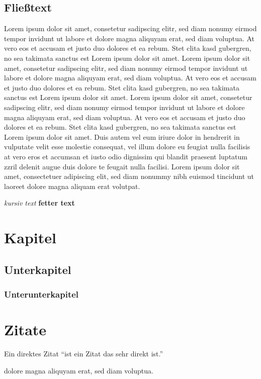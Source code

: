 \documentclass[a4paper, 12pt]{article}
\begin{document}
\subsection{Fließtext}
Lorem ipsum dolor sit amet, consetetur sadipscing elitr, sed diam nonumy eirmod tempor invidunt ut labore et dolore magna aliquyam erat, sed diam voluptua. At vero eos et accusam et justo duo dolores et ea rebum. Stet clita kasd gubergren, no sea takimata sanctus est Lorem ipsum dolor sit amet. Lorem ipsum dolor sit amet, consetetur sadipscing elitr, sed diam nonumy eirmod tempor invidunt ut labore et dolore magna aliquyam erat, sed diam voluptua. At vero eos et accusam et justo duo dolores et ea rebum. Stet clita kasd gubergren, no sea takimata sanctus est Lorem ipsum dolor sit amet. Lorem ipsum dolor sit amet, consetetur sadipscing elitr, sed diam nonumy eirmod tempor invidunt ut labore et dolore magna aliquyam erat, sed diam voluptua. At vero eos et accusam et justo duo dolores et ea rebum. Stet clita kasd gubergren, no sea takimata sanctus est Lorem ipsum dolor sit amet.
Duis autem vel eum iriure dolor in hendrerit in vulputate velit esse molestie consequat, vel illum dolore eu feugiat nulla facilisis at vero eros et accumsan et iusto odio dignissim qui blandit praesent luptatum zzril delenit augue duis dolore te feugait nulla facilisi. Lorem ipsum dolor sit amet, consectetuer adipiscing elit, sed diam nonummy nibh euismod tincidunt ut laoreet dolore magna aliquam erat volutpat.

\textit{kursiv text}    \textbf{fetter text}

\section{Kapitel}
\subsection{Unterkapitel}
\subsubsection{Unterunterkapitel}

\newpage

\section{Zitate}
Ein direktes Zitat \enquote{ist ein Zitat das sehr direkt ist.}\cite{DIN.2008}

dolore magna aliquyam erat, sed diam voluptua.\cite{Fowler.2006} \cite{GitLab.2025}
\end{document}
